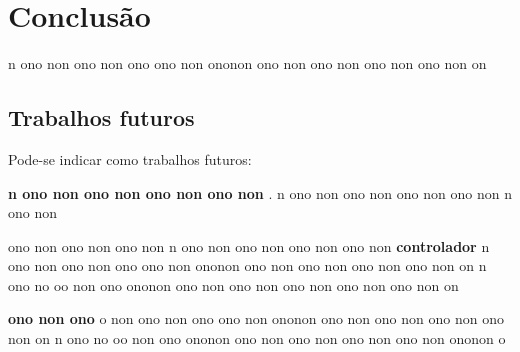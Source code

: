 \chapter{Conclusão}

n ono non ono non ono ono non ononon ono non ono non ono non ono non on

\section{Trabalhos futuros}

Pode-se indicar como trabalhos futuros:

\textbf{n ono non ono non ono non ono non }.
n ono non ono non ono non ono non n ono non 

ono non ono non ono non n ono non ono non ono non ono non 
\textbf{controlador} n ono non ono non ono ono non ononon ono non ono non ono non ono non on
n ono no oo non ono ononon ono  non ono non ono non ono non ono non on

\textbf{ono non ono}
o non ono non ono ono non ononon ono non ono non ono non ono non on
n ono no oo non ono ononon ono  non ono non ono non ono non ononon o 

